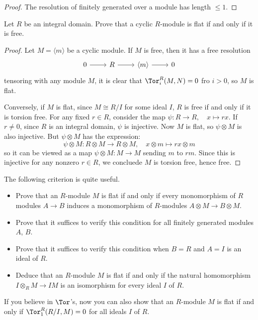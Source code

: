 \begin{proof}
The resolution of finitely generated over a module has length $\leqslant 1$.
\end{proof}
\begin{exercise}\label{flat iff free}
Let $R$ be an integral domain. Prove that a cyclic $R$-module is flat if and only if it is free.
\end{exercise}
\begin{proof}
Let $M=\langle m\rangle$ be a cyclic module. If $M$ is free, then it has a free resolution
\[\begin{tikzcd}
0\ar[r]&R\ar[r]&\langle m\rangle\ar[r]&0
\end{tikzcd}\]
tensoring with any module $M$, it is clear that $\Tor^R_i(M,N)=0$ fro $i>0$, so $M$ is flat.\par
Conversely, if $M$ is flat, since $M\cong R/I$ for some ideal $I$, $R$ is free if and only if it is torsion free. For any fixed $r\in R$, consider the map $\psi:R\to R,\quad x\mapsto rx$. If $r\neq0$, since $R$ is an integral domain, $\psi$ is injective. Now $M$ is flat, so $\psi\otimes M$ is also injective. But $\psi\otimes M$ has the expression:
\[\psi\otimes M:R\otimes M\to R\otimes M,\quad x\otimes m\mapsto rx\otimes m\]
so it can be viewed as a map $\psi\otimes M:M\to M$ sending $m$ to $rm$. Since this is injective for any nonzero $r\in R$, we concluede $M$ is torsion free, hence free.
\end{proof}
\begin{exercise}\label{flat crit}
The following criterion is quite useful.
\begin{itemize}
\item Prove that an $R$-module $M$ is flat if and only if every monomorphism of $R$ modules $A\to B$ induces a monomorphism of $R$-modules $A\otimes M\to B\otimes M$.
\item Prove that it suffices to verify this condition for all finitely generated modules $A$, $B$.
\item Prove that it suffices to verify this condition when $B=R$ and $A=I$ is an ideal of $R$.
\item Deduce that an $R$-module $M$ is flat if and only if the natural homomorphism $I\otimes_{R}M\to IM$ is an isomorphism for every ideal $I$ of $R$.
\end{itemize}
If you believe in $\Tor$'s, now you can also show that an $R$-module $M$ is flat if and only if $\Tor^R_1(R/I,M)=0$ for all ideals $I$ of $R$.
\end{exercise}
